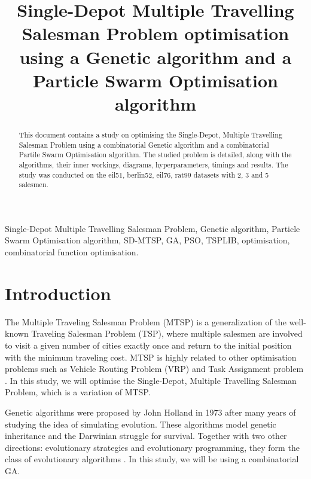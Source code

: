 \documentclass[conference]{IEEEtran}
\begin{document}
\title{Single-Depot Multiple Travelling Salesman Problem optimisation using a Genetic algorithm and a Particle Swarm Optimisation algorithm}

\author{
}
\maketitle

\begin{abstract}
    This document contains a study on optimising the Single-Depot, Multiple Travelling Salesman Problem using a combinatorial
    Genetic algorithm and a combinatorial Partile Swarm Optimisation algorithm. The studied problem is detailed, along with
    the algorithms, their inner workings, diagrams, hyperparameters, timings and results. The study was conducted on the eil51,
    berlin52, eil76, rat99 datasets with 2, 3 and 5 salesmen.
\end{abstract}

\begin{IEEEkeywords}
Single-Depot Multiple Travelling Salesman Problem, Genetic algorithm, Particle Swarm Optimisation algorithm, SD-MTSP,
GA, PSO, TSPLIB, optimisation, combinatorial function optimisation.
\end{IEEEkeywords}

\section{Introduction}
The Multiple Traveling Salesman Problem (MTSP) is a generalization of the well-known Traveling Salesman Problem (TSP),
where multiple salesmen are involved to visit a given number of cities exactly once and return to the initial position
with the minimum traveling cost. MTSP is highly related to other optimisation problems such as Vehicle Routing Problem (VRP)
and Task Assignment problem \cite{b1}. In this study, we will optimise the Single-Depot, Multiple Travelling Salesman Problem,
which is a variation of MTSP.

Genetic algorithms were proposed by John Holland in 1973 after many years of studying the idea of simulating evolution.
These algorithms model genetic inheritance and the Darwinian struggle for survival. Together with two other directions: evolutionary
strategies and evolutionary programming, they form the class of evolutionary algorithms \cite{b2}. In this study, we will
be using a combinatorial GA.
\end{document}
